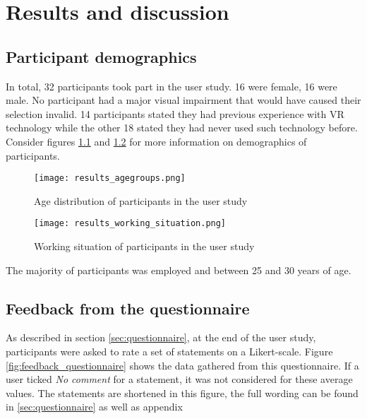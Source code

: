 \chapter{Results and discussion}
\label{sec:results_and_discussion}

	\section{Participant demographics}
	\label{sec:participant_demographics}

In total, 32 participants took part in the user study. 16 were female, 16 were male. No participant had a major visual impairment that would have caused their selection invalid. 14 participants stated they had previous experience with VR technology while the other 18 stated they had never used such technology before. Consider figures \ref{fig:results_agegroups} and \ref{fig:results_working_situation} for more information on demographics of participants.

\begin{figure}[h]
	\centering
	\texttt{[image: results\_agegroups.png]}\\ %
	\caption{Age distribution of participants in the user study}
	\label{fig:results_agegroups}
\end{figure}

\begin{figure}[h]
	\centering
	\texttt{[image: results\_working\_situation.png]}\\ %
	\caption{Working situation of participants in the user study}
	\label{fig:results_working_situation}
\end{figure}

The majority of participants was employed and between 25 and 30 years of age.

	\section{Feedback from the questionnaire}
	\label{sec:results_feedback_from_questionnaire}

As described in section \ref{sec:questionnaire}, at the end of the user study, participants were asked to rate a set of statements on a Likert-scale. Figure \ref{fig:feedback_questionnaire} shows the data gathered from this questionnaire. If a user ticked \textit{No comment} for a statement, it was not considered for these average values. The statements are shortened in this figure, the full wording can be found in \ref{sec:questionnaire} as well as appendix 

